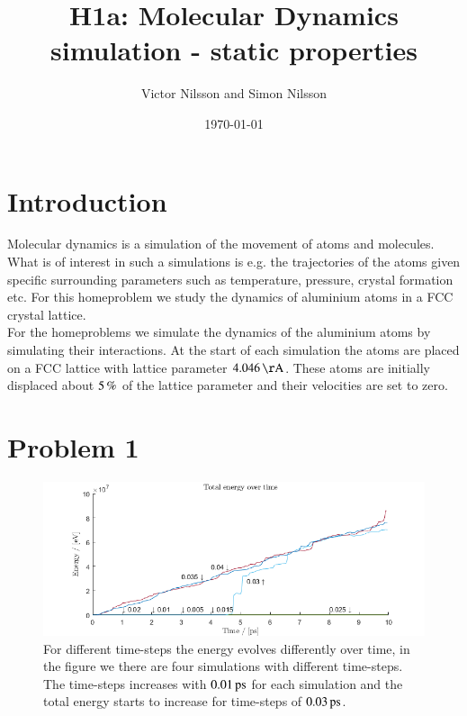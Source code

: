



\title{H1a: Molecular Dynamics simulation - static properties}
\author{Victor Nilsson and Simon Nilsson}
\date{\today}





\section*{Introduction}

Molecular dynamics is a simulation of the movement of atoms and molecules. What is of interest in such a simulations is e.g. the trajectories of the atoms given specific surrounding parameters such as temperature, pressure, crystal formation etc. For this homeproblem we study the dynamics of aluminium atoms in a FCC crystal lattice.\\

For the homeproblems we simulate the dynamics of the aluminium atoms by simulating their interactions. At the start of each simulation the atoms are placed on a FCC lattice with lattice parameter $\unit[4.046]{Å}$. These atoms are initially displaced about $\unit[5]{\%}$ of the lattice parameter and their velocities are set to zero.

\section*{Problem 1}

\begin{figure}[H]
    \centering
    \includegraphics[width=\textwidth]{graphics/task1/energy.png}
    \caption{For different time-steps the energy evolves differently over time, in the figure we there are four simulations with different time-steps. The time-steps increases with $\unit[0.01]{ps}$ for each simulation and the total energy starts to increase for time-steps of $\unit[0.03]{ps}$.}
    \label{fig:timestep}
\end{figure}

